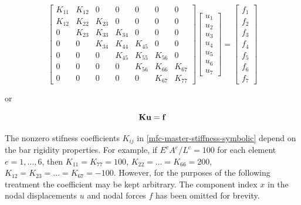 \begin{equation}\label{mfc-master-stiffness-symbolic}
    \begin{bmatrix}
        K_{11} & K_{12} & 0 & 0 & 0 & 0 & 0 \\
        K_{12} & K_{22} & K_{23} & 0 & 0 & 0 & 0 \\
        0 & K_{23} & K_{33} & K_{34} & 0 & 0 & 0 \\
        0 & 0 & K_{34} & K_{44} & K_{45} & 0 & 0 \\
        0 & 0 & 0 & K_{45} & K_{55} & K_{56} & 0 \\
        0 & 0 & 0 & 0 & K_{56} & K_{66} & K_{67} \\
        0 & 0 & 0 & 0 & 0 & K_{67} & K_{77}
    \end{bmatrix}
    \begin{bmatrix}
        u_1 \\
        u_2 \\
        u_3 \\
        u_4 \\
        u_5 \\
        u_6 \\
        u_7
    \end{bmatrix}
    = \begin{bmatrix}
        f_1 \\
        f_2 \\
        f_3 \\
        f_4 \\
        f_5 \\
        f_6 \\
        f_7
    \end{bmatrix}
\end{equation}

or

\begin{equation}\label{mfc-master-equation-symbolic}
    \mathbf{K} \mathbf{u} = \mathbf{f}
\end{equation}

The nonzero stifness coefficients $ K_{ij} $ in \eqref{mfc-master-stiffness-symbolic}
depend on the bar rigidity properties. For example, if
$ E^e A^e / L^e = 100 $ for each element $ e = 1, \dots , 6 $, then
$ K_{11} = K_{77} = 100 $, $ K_{22} = \dots = K_{66} = 200 $,
$ K_{12} = K_{23} = \dots = K_{67} = -100 $. However, for the purposes of the
following treatment the coefficient may be kept arbitrary. The component index
$ x $ in the nodal displacements $ u $ and nodal forces $ f $ has been omitted
for brevity.


